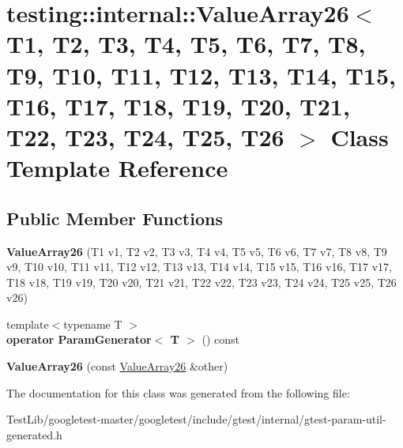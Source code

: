 \hypertarget{classtesting_1_1internal_1_1ValueArray26}{}\section{testing\+:\+:internal\+:\+:Value\+Array26$<$ T1, T2, T3, T4, T5, T6, T7, T8, T9, T10, T11, T12, T13, T14, T15, T16, T17, T18, T19, T20, T21, T22, T23, T24, T25, T26 $>$ Class Template Reference}
\label{classtesting_1_1internal_1_1ValueArray26}
\subsection*{Public Member Functions}
\begin{DoxyCompactItemize}
\item 
\mbox{\label{classtesting_1_1internal_1_1ValueArray26_aec16334223f12b85aa7b6c260ac5567b}} 
{\bfseries Value\+Array26} (T1 v1, T2 v2, T3 v3, T4 v4, T5 v5, T6 v6, T7 v7, T8 v8, T9 v9, T10 v10, T11 v11, T12 v12, T13 v13, T14 v14, T15 v15, T16 v16, T17 v17, T18 v18, T19 v19, T20 v20, T21 v21, T22 v22, T23 v23, T24 v24, T25 v25, T26 v26)
\item 
\mbox{\label{classtesting_1_1internal_1_1ValueArray26_adc70c82cb08c26c952e2d41b23844a72}} 
{\footnotesize template$<$typename T $>$ }\\{\bfseries operator Param\+Generator$<$ T $>$} () const
\item 
\mbox{\label{classtesting_1_1internal_1_1ValueArray26_a7a19431c15974a7aa81143a668ed035e}} 
{\bfseries Value\+Array26} (const \hyperlink{classtesting_1_1internal_1_1ValueArray26}{Value\+Array26} \&other)
\end{DoxyCompactItemize}


The documentation for this class was generated from the following file\+:\begin{DoxyCompactItemize}
\item 
Test\+Lib/googletest-\/master/googletest/include/gtest/internal/gtest-\/param-\/util-\/generated.\+h\end{DoxyCompactItemize}
